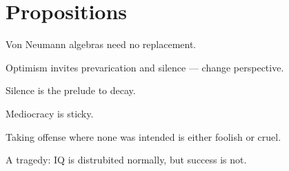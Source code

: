 \documentclass[a]{subfiles}
\begin{document}
\chapter{Propositions}
\begin{parsec}%
Von Neumann algebras
need no replacement.
\end{parsec}
\begin{parsec}%
Optimism
invites prevarication and silence
--- change perspective.
\end{parsec}
\begin{parsec}%
Silence is the prelude to decay.
\end{parsec}
\begin{parsec}%
Mediocracy is sticky.
\end{parsec}
\begin{parsec}%
Taking offense where none was intended
is either foolish or cruel.
\end{parsec}
\begin{parsec}%
A tragedy:
IQ is distrubited normally,
but success is not.
\end{parsec}
\end{document}
